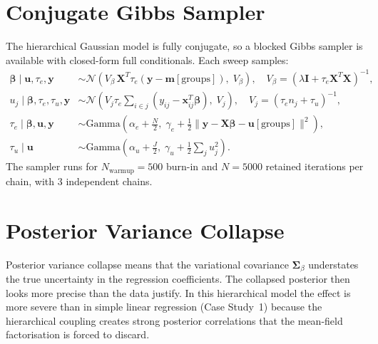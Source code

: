 \documentclass[11pt,a4paper]{article}
\begin{document}
\section{Conjugate Gibbs Sampler}

The hierarchical Gaussian model is fully conjugate, so a blocked Gibbs sampler is
available with closed-form full conditionals.
Each sweep samples:
\begin{align}
  \bm{\beta} \mid \mathbf{u}, \tau_e, \mathbf{y}
    &\sim \mathcal{N}(V_\beta\,\bm{X}^T\tau_e(\mathbf{y}-\bm{m}[\mathrm{groups}]),\; V_\beta),
    \quad V_\beta = (\lambda\bm{I} + \tau_e\bm{X}^T\bm{X})^{-1},\\
  u_j \mid \bm{\beta}, \tau_e, \tau_u, \mathbf{y}
    &\sim \mathcal{N}(V_j\tau_e\!\sum_{i\in j}(y_{ij} - \mathbf{x}_{ij}^T\bm{\beta}),\; V_j),
    \quad V_j = (\tau_e n_j + \tau_u)^{-1},\\
  \tau_e \mid \bm{\beta}, \mathbf{u}, \mathbf{y}
    &\sim \mathrm{Gamma}\!\left(\alpha_e + \tfrac{N}{2},\;
      \gamma_e + \tfrac{1}{2}\|\mathbf{y}-\bm{X}\bm{\beta}-\mathbf{u}[\mathrm{groups}]\|^2\right),\\
  \tau_u \mid \mathbf{u}
    &\sim \mathrm{Gamma}\!\left(\alpha_u + \tfrac{J}{2},\;
      \gamma_u + \tfrac{1}{2}\sum_j u_j^2\right).
\end{align}
The sampler runs for $N_{\mathrm{warmup}} = 500$ burn-in and $N = 5000$ retained
iterations per chain, with 3 independent chains.

\section{Posterior Variance Collapse}
\label{sec:variance-collapse}

Posterior variance collapse means that the variational covariance $\bm{\Sigma}_\beta$
understates the true uncertainty in the regression coefficients.
The collapsed posterior then looks more precise than the data justify.
In this hierarchical model the effect is more severe than in simple linear regression
(Case Study~1) because the hierarchical coupling creates strong posterior correlations
that the mean-field factorisation is forced to discard.
\end{document}

